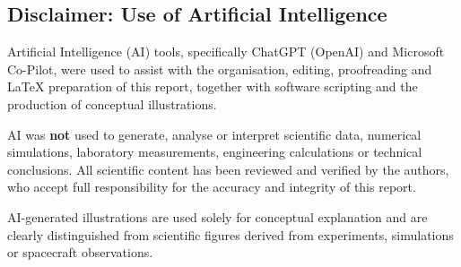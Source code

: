 %

\clearpage


\begin{notebox}{}
	
\section*{Disclaimer: Use of Artificial Intelligence}

Artificial Intelligence (AI) tools, specifically ChatGPT (OpenAI) and Microsoft Co-Pilot, were used to assist with the organisation, editing, proofreading and \LaTeX{} preparation of this report, together with software scripting and the production of conceptual illustrations.

AI was \textbf{not} used to generate, analyse or interpret scientific data, numerical simulations, laboratory measurements, engineering calculations or technical conclusions. All scientific content has been reviewed and verified by the authors, who accept full responsibility for the accuracy and integrity of this report.

AI-generated illustrations are used solely for conceptual explanation and are clearly distinguished from scientific figures derived from experiments, simulations or spacecraft observations.
\end{notebox}
